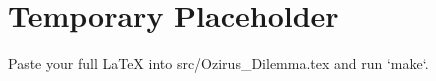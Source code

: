 \documentclass[11pt]{article}
\begin{document}
\section*{Temporary Placeholder}
Paste your full LaTeX into src/Ozirus\_Dilemma.tex and run `make`.
\end{document}
